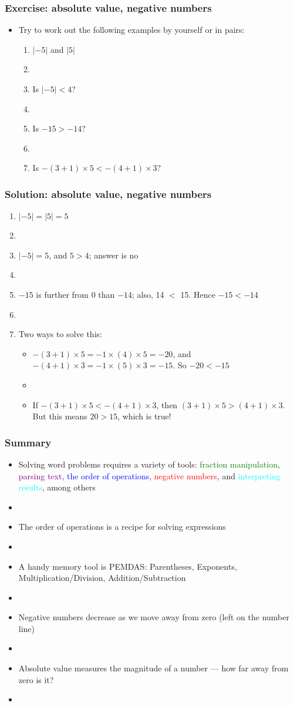\documentclass[11pt,dvipsnames]{beamer}
\newcommand{\myframe}[1]{\begin{frame} \frametitle{#1}}
\begin{document}
\myframe{Exercise: absolute value, negative numbers}
\begin{itemize}
\item Try to work out the following examples by yourself or in pairs:
\begin{enumerate}
\item $|-5|$ and $|5|$
\item[]
\item Is $|-5| < 4$?
\item[]
\item Is $-15 > -14$? 
\item[]
\item Is $-(3 + 1)\times 5 < -(4 + 1)\times 3$?
\end{enumerate}
\end{itemize}
\end{frame}

\myframe{Solution: absolute value, negative numbers}
\begin{enumerate}
\item $|-5| = |5| = 5$
\item[]
\item $|-5| = 5$, and $5 > 4$; answer is no
\item[]
\item $-15$ is further from 0 than $-14$; also, 14 $<$ 15. Hence $-15 < -14$
\item[]
\item Two ways to solve this:
\begin{itemize}
\item $-(3+1)\times 5 = -1\times(4)\times 5 = -20$, and $-(4+1)\times 3 = -1\times (5) \times 3 = -15$. So $-20 < -15$
\item[]
\item If $-(3+1)\times 5 < -(4+1)\times 3$, then $(3+1)\times 5 > (4+1)\times 3$. But this means $20 > 15$, which is true!
\end{itemize}
\end{enumerate}
\end{frame}

\myframe{Summary}
\begin{itemize}
\item Solving word problems requires a variety of tools: \textcolor{green}{fraction manipulation}, \textcolor{purple}{parsing text}, \textcolor{blue}{the order of operations}, \textcolor{red}{negative numbers}, and \textcolor{cyan}{interpreting results}, among others
\item[]
\item The order of operations is a recipe for solving expressions
\item[]
\item A handy memory tool is PEMDAS: Parentheses, Exponents, Multiplication/Division, Addition/Subtraction
\item[]
\item Negative numbers decrease as we move away from zero (left on the number line)
\item[]
\item Absolute value measures the magnitude of a number --- how far away from zero is it?
\item[]
\end{itemize}
\end{frame}
\end{document}
